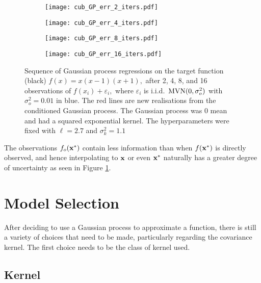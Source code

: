 \begin{figure}[htbp]
    \centering
    \begin{subfigure}[b]{0.5\textwidth}
        \centering
        \texttt{[image: cub\_GP\_err\_2\_iters.pdf]}
    \end{subfigure}%
    \hfill%
    \begin{subfigure}[b]{0.5\textwidth}
        \centering
        \texttt{[image: cub\_GP\_err\_4\_iters.pdf]}
    \end{subfigure}
    \begin{subfigure}[b]{0.5\textwidth}
        \centering
        \texttt{[image: cub\_GP\_err\_8\_iters.pdf]}
    \end{subfigure}%
    \hfill%
    \begin{subfigure}[b]{0.5\textwidth}
        \centering
        \texttt{[image: cub\_GP\_err\_16\_iters.pdf]}
    \end{subfigure}%
    \caption{
        Sequence of Gaussian process regressions on the target function
        (black) $f(x) = x(x-1)(x+1),$ after 2, 4, 8, and 16 observations of
        $f(x_i) + \varepsilon_i,$ where $\varepsilon_i$ is i.i.d.\
        $\operatorname{MVN}(0, \sigma^2_o)$ with $\sigma^2_o = 0.01$
        in blue. The red lines are new realisations from the conditioned
        Gaussian process. The Gaussian process was 0 mean and had a squared
        exponential kernel. The hyperparameters were fixed with $\ell = 2.7$
        and $\sigma^2_k = 1.1$
    }
    \label{fig:var_cub_reg}
\end{figure}

The observations $f_o(\mathbf{x}^\ast)$ contain less information than when $f(\mathbf{x}^\ast)$
is directly observed, and hence interpolating to $\mathbf{x}$ or even $\mathbf{x}^\ast$
naturally has a
greater degree of uncertainty as seen in Figure \ref{fig:var_cub_reg}.

\section{Model Selection}

After deciding to use a Gaussian process to approximate a function, there is
still a variety of choices that need to be made, particularly
regarding the covariance kernel. The first
choice needs to be the class of kernel used.

\subsection*{Kernel}

